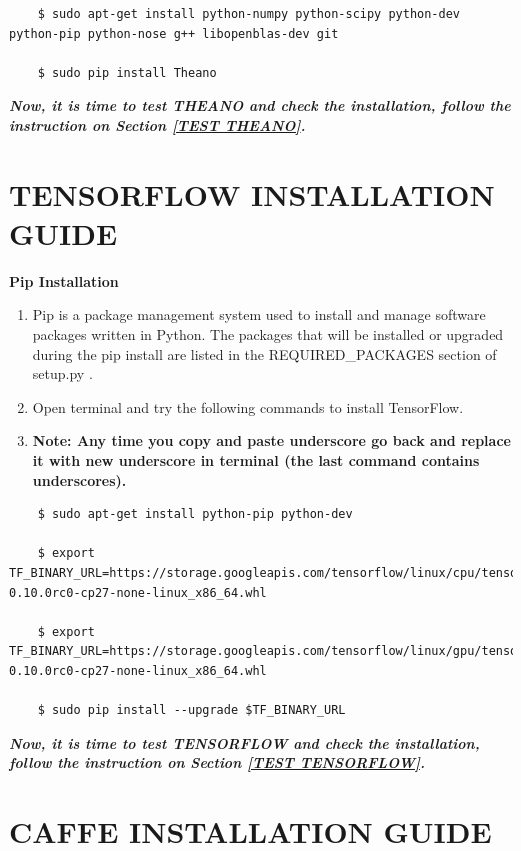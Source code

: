 \documentclass[12pt]{article}
\begin{document}
\begin{lstlisting}
    $ sudo apt-get install python-numpy python-scipy python-dev python-pip python-nose g++ libopenblas-dev git

    $ sudo pip install Theano
\end{lstlisting}

\textbf{\emph{Now, it is time to test THEANO and check the installation, follow the instruction on Section \ref{TEST THEANO}.}}

\newpage
\section{TENSORFLOW INSTALLATION GUIDE}

\textbf{Pip Installation}

\begin{enumerate}
  \item Pip is a package management system used to install and manage software packages written in Python. The packages that will be installed or upgraded during the pip install are listed in the REQUIRED\_PACKAGES section of setup.py \cite{TENSORFLOW}.
  \item Open terminal and try the following commands to install TensorFlow.
  \item \textbf{Note: Any time you copy and paste underscore go back and replace it with new underscore in terminal (the last command contains underscores).}
\end{enumerate}


\begin{lstlisting}
    $ sudo apt-get install python-pip python-dev

    $ export TF_BINARY_URL=https://storage.googleapis.com/tensorflow/linux/cpu/tensorflow-0.10.0rc0-cp27-none-linux_x86_64.whl

    $ export TF_BINARY_URL=https://storage.googleapis.com/tensorflow/linux/gpu/tensorflow-0.10.0rc0-cp27-none-linux_x86_64.whl

    $ sudo pip install --upgrade $TF_BINARY_URL
\end{lstlisting}

\textbf{\emph{Now, it is time to test TENSORFLOW and check the installation, follow the instruction on Section \ref{TEST TENSORFLOW}.}}

\newpage
\section{CAFFE INSTALLATION GUIDE}
\end{document}
